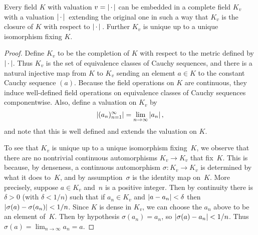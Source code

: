 \begin{theorem}
Every field $K$ with valuation $v=\left|\,\cdot\,\right|$ can be
embedded in a complete field $K_v$ with a valuation $\left|\,\cdot\,\right|{}$
extending the original one in such a way that $K_v$ is the closure of
$K$ with respect to $\left|\,\cdot\,\right|{}$.  Further $K_v$ is unique up to
a unique isomorphism fixing $K$.
\end{theorem}
\begin{proof}
Define $K_v$ to be the completion of $K$ with respect to the metric
defined by $\left|\,\cdot\,\right|$.  Thus $K_v$ is the set of equivalence classes of
Cauchy sequences, and there is a natural injective map from $K$ to
$K_v$ sending an element $a\in K$ to the constant Cauchy sequence
$(a)$.  Because the field operations on $K$ are continuous, they
induce well-defined field operations on equivalence classes of Cauchy
sequences componentwise.   Also, define a valuation on $K_v$ by
$$\left|(a_n)_{n=1}^{\infty}\right| = \lim_{n\to\infty} \left|a_n\right|,$$ and note
that this is well defined and extends the valuation on $K$.

To see that $K_v$ is unique up to a unique isomorphism fixing~$K$, we
observe that there are no nontrivial continuous automorphisms $K_v\to
K_v$ that fix~$K$.  This is because, by denseness, a continuous
automorphism $\sigma: K_v\to K_v$ is determined by what it does
to~$K$, and by assumption~$\sigma$ is the identity map on~$K$.  More
precisely, suppose $a\in K_v$ and~$n$ is a positive integer.  Then by
continuity there is $\delta>0$ (with $\delta<1/n$) such that if
$a_n\in K_v$ and $\left|a-a_n\right|<\delta$ then
$\left|\sigma(a)-\sigma(a_n)\right|<1/n$.  Since $K$ is dense in $K_v$, we
can choose the $a_n$ above to be an element of~$K$.  Then by
hypothesis $\sigma(a_n)=a_n$, so $\left|\sigma(a) - a_n\right| < 1/n$.  Thus
$\sigma(a) = \lim_{n\to\infty} a_n = a$.
\end{proof}

